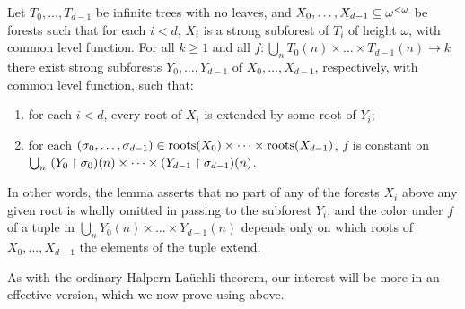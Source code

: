 \begin{theorem}\label{lem:hl-forest}
  Let $T_0,\dots, T_{d-1}$ be infinite trees with no leaves, and $X_0,\dots, X_{d-1} \subseteq {\omega^{<\omega}}$ be forests such that for each $i<d$, $X_i$ is a strong subforest of $T_i$ of height $\omega$, with common level function. For all $k \geq 1$ and all $f:\bigcup_n T_0(n)\times\dots\times T_{d-1}(n)\to k$ there exist strong subforests $Y_0,\ldots,Y_{d-1}$ of $X_0,\ldots,X_{d-1}$, respectively, with common level function, such that:
  \begin{enumerate}
  	\item for each $i < d$, every root of $X_i$ is extended by some root of $Y_i$;
  	\item for each $(\sigma_0,\ldots,\sigma_{d-1}) \in \operatorname{roots}(X_0) \times \cdots \times \operatorname{roots}(X_{d-1})$, $f$ is constant on $\bigcup_n~(Y_0 \upharpoonright \sigma_0)(n) \times \cdots \times (Y_{d-1} \upharpoonright \sigma_{d-1})(n)$.
  \end{enumerate}
\end{theorem}

\noindent In other words, the lemma asserts that no part of any of the forests $X_i$ above any given root is wholly omitted in passing to the subforest $Y_i$, and the color under $f$ of a tuple in $\bigcup_n Y_0(n)\times\dots\times Y_{d-1}(n)$ depends only on which roots of $X_0,\dots, X_{d-1}$ the elements of the tuple extend.

As with the ordinary Halpern-La\"{u}chli theorem, our interest will be more in an effective version, which we now prove using  above.


